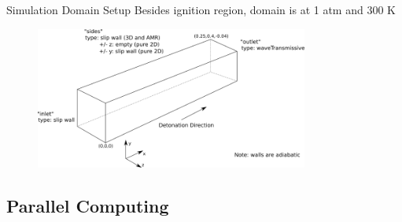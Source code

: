 \begin{frame}{Simulation Domain Setup}
Besides ignition region, domain is at 1 atm and 300 K
\begin{figure}[t!]
\centering
\includegraphics[width=0.8\textwidth]{../figs/domainBC.png}
\end{figure}%
\end{frame}

\subsection{Parallel Computing}

